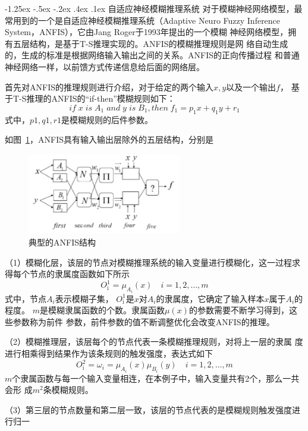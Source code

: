 \documentclass[12pt, a4paper]{article}
\makeatletter
\newcommand*{\hei}{\CJKfamily{zhhei}}
\newcommand{\xiaosihao}{\fontsize{12pt}{\baselineskip}\selectfont}
\renewcommand\subsection{\@startsection{subsection}{1}{\z@}%
{-1.25ex \@plus -.5ex \@minus -.2ex}%
{.4ex \@plus .1ex}%
{\normalfont\xiaosihao\bf\hei}}
\makeatother
\begin{document}
\subsection{自适应神经模糊推理系统}
对于模糊神经网络模型，最常用到的一个是自适应神经模糊推理系统\cite{Jang JSR}（Adaptive
Neuro Fuzzy Inference System，ANFIS），它由Jang Roger于1993年提出的一个模糊
神经网络模型，拥有五层结构，是基于T-S推理实现的。ANFIS的模糊推理规则是网
络自动生成的，生成的标准是根据网络输入输出之间的关系。ANFIS的正向传播过程
和普通神经网络一样，以前馈方式传递信息给后面的网络层。
\par
首先对ANFIS的推理规则进行介绍，对于给定的两个输入$x,y$以及一个输出$f$，
基于T-S推理的ANFIS的“if-then”模糊规则如下：
$$if \; x \; is \; A_1 \; and \; y \; is \; B_1, then \; f_1=p_1x+q_1y+r_1$$
式中，$p1, q1, r1$是模糊规则的后件参数。
\par
如图~\ref{fig:2}，ANFIS具有输入输出层除外的五层结构，分别是
\par
\begin{figure}[htbp] %
	\centering
	\includegraphics[width=0.6\textwidth]{典型的ANFIS结构.png} %
	\caption{典型的ANFIS结构}
	\label{fig:2}
\end{figure}
\par
（1）模糊化层，该层的节点对模糊推理系统的输入变量进行模糊化，这一过程求得每个节点的隶属度函数如下所示
\[O_{\text{i}}^{\text{1}} = \mu_{A_i}(x) \quad i=1,2,\ldots,m \]
式中，节点$A_i$表示模糊子集， $O_{\text{i}}^{\text{1}}$是$x$对$A_i$的隶属度，它确定了输入样本$x$属于$A_i$的程度。
$m$是模糊隶属函数的个数。隶属函数$\mu(x)$的参数需要不断学习得到，这些参数称为前件
参数，前件参数的值不断调整优化会改变ANFIS的推理。
\par
（2）模糊推理层，该层每个的节点代表一条模糊推理规则，对将上一层的隶属
度进行相乘得到结果作为该条规则的触发强度，表达式如下
\[O_{\text{i}}^{\text{2}} = \omega_i = \mu_{A_i}(x)\mu_{B_i}(y) \quad i=1,2,\ldots,m \]
$m$个隶属函数与每一个输入变量相连，在本例子中，输入变量共有2个，那么一共会形
成$m^2$条模糊规则。
\par
（3）第三层的节点数量和第二层一致，该层的节点代表的是模糊规则触发强度进行归一
\end{document}
